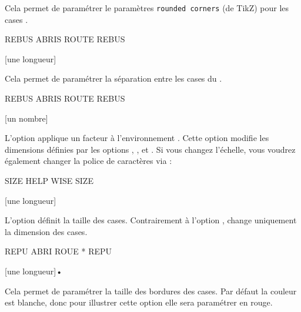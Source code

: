 \documentclass[svgnames]{report}
\begin{document}
  Cela permet de paramétrer le paramètres \texttt{rounded corners} (de TikZ) pour les cases .

  \begin{example}
  \begin{wordle}[Arrondi=2.5mm]{REBUS}
    ABRIS
    ROUTE
    REBUS
  \end{wordle}
  \end{example}

  [une longueur]

  Cela permet de paramétrer la séparation entre les cases du .

  \begin{example}
  \begin{wordle}[Separation=2mm,CouleurBordures=black]{REBUS}
    ABRIS
    ROUTE
    REBUS
  \end{wordle}
  \end{example}

  [un nombre]

  L'option  applique un facteur à l'environnement .
  Cette option modifie les dimensions définies par les options ,
  ,  et . Si vous changez l'échelle, vous voudrez également changer la police de caractères via  :

  \begin{example}
  \begin{wordle}[Echelle=1.5,Police=\huge\bfseries]{SIZE}
     HELP
     WISE
     SIZE
  \end{wordle}
  \end{example}

  [une longueur]

  L'option  définit la taille des cases. Contrairement à l'option ,  change uniquement la dimension des cases.

  \begin{example}
  \begin{wordle}[Taille=10mm,Police=\huge\bfseries]{REPU}
     ABRI ROUE * REPU
  \end{wordle}
  \end{example}

  [une longueur]•

  Cela permet de paramétrer la taille des bordures des cases. Par défaut la couleur est blanche, donc pour illustrer cette option elle sera paramétrer en rouge.
\end{document}
